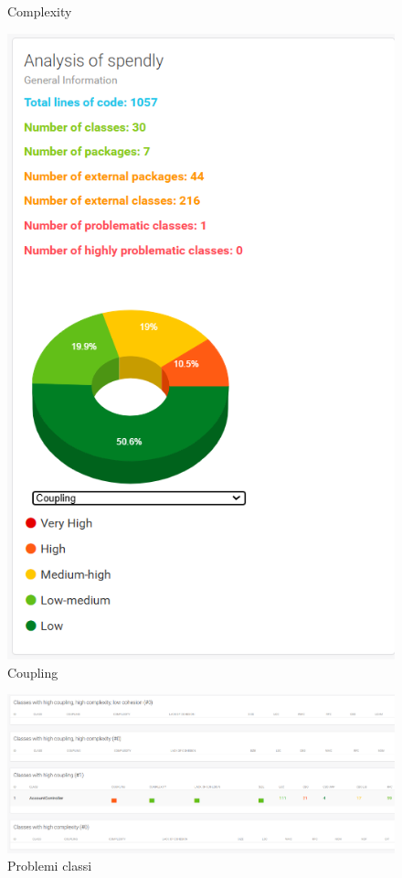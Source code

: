 \begin{figure}[H]
\begin{minipage}{0.45\textwidth}
        \caption{Complexity}
        \label{fig:Complexity_iterazione2}
    \end{minipage}
    \hfill
    \begin{minipage}{0.45\textwidth}
        \centering
        \includegraphics[width=\textwidth]{images/Coupling_iter2.png}
        \caption{Coupling}
        \label{fig:Coupling_iterazione2}
    \end{minipage}
\end{figure}

\begin{figure}[H]
    \centering
    \includegraphics[width=1\textwidth]{images/Problem_iter2.png}
    \caption{Problemi classi}
    \label{fig:Problemi_iterazione2}
\end{figure}


